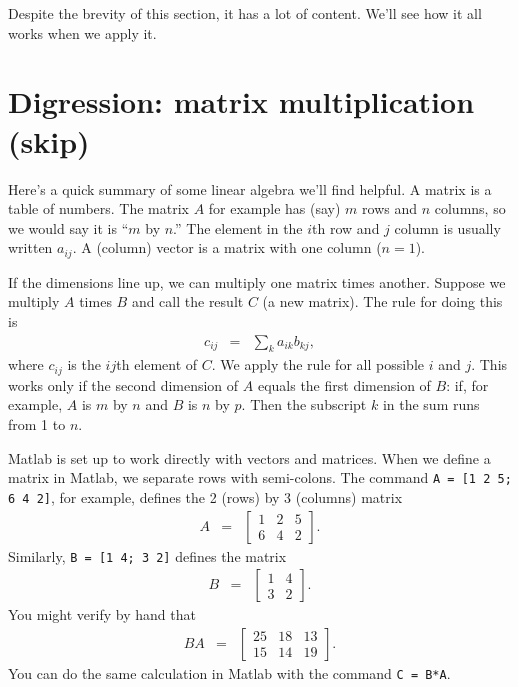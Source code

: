 \documentclass[11pt]{article}
\begin{document}
Despite the brevity of this section, it has a lot of content.
We'll see how it all works when we apply it.


\section{Digression:  matrix multiplication (skip)}

Here's a quick summary of some linear algebra we'll find helpful.
A matrix is a table of numbers.
The matrix $A$ for example has (say) $m$ rows and $n$ columns,
so we would say it is ``$m$ by $n$.''
The element in the $i$th row and $j$ column is usually written $a_{ij}$.
A (column) vector is a matrix with one column ($n=1$).

If the dimensions line up, we can multiply
one matrix times another.
Suppose we multiply $A$ times $B$ and call the result $C$ (a new matrix).
The rule for doing this is
\begin{eqnarray*}
    c_{ij} &=& \sum_k a_{ik} b_{kj} ,
\end{eqnarray*}
where $c_{ij}$ is the $ij$th element of $C$.
We apply the rule for all possible $i$ and $j$.
This works only if the second dimension of $A$ equals the first dimension of $B$:
if, for example, $A$ is $m$ by $n$ and $B$ is $n$ by $p$.
Then the subscript $k$ in the sum runs from 1 to $n$.

Matlab is set up to work directly with vectors and matrices.
When we define a matrix in Matlab, we separate rows with semi-colons.
The command {\tt A = [1 2 5; 6 4 2]}, for example,
defines the 2 (rows) by 3 (columns) matrix
\begin{eqnarray*}
    A &=& \left[
            \begin{array}{ccc}
            1 & 2 & 5 \\ 6 & 4 & 2
            \end{array}
            \right] .
\end{eqnarray*}
Similarly, {\tt B = [1 4; 3 2]} defines the matrix
\begin{eqnarray*}
    B &=& \left[
            \begin{array}{ccc}
            1 & 4 \\  3 & 2
            \end{array}
            \right] .
\end{eqnarray*}
You might verify by hand that
\begin{eqnarray*}
    BA &=& \left[
            \begin{array}{ccc}
            25 & 18 & 13 \\  15 & 14  & 19
            \end{array}
            \right] .
\end{eqnarray*}
You can do the same calculation in Matlab with the command
{\tt C = B*A}.
\end{document}
